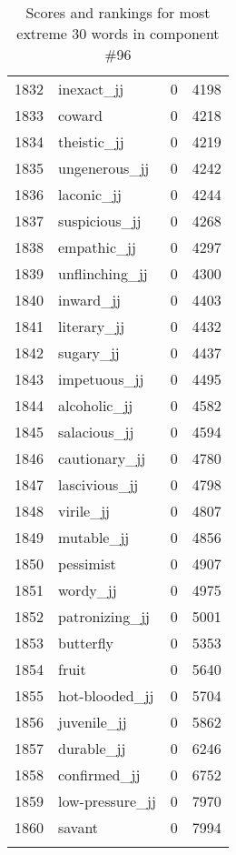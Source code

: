 \begin{longtable}[!htbp]{| rlr@{.}l |}
    1832 & inexact\_jj & 0 & 4198 \\
    1833 & coward & 0 & 4218 \\
    1834 & theistic\_jj & 0 & 4219 \\
    1835 & ungenerous\_jj & 0 & 4242 \\
    1836 & laconic\_jj & 0 & 4244 \\
    1837 & suspicious\_jj & 0 & 4268 \\
    1838 & empathic\_jj & 0 & 4297 \\
    1839 & unflinching\_jj & 0 & 4300 \\
    1840 & inward\_jj & 0 & 4403 \\
    1841 & literary\_jj & 0 & 4432 \\
    1842 & sugary\_jj & 0 & 4437 \\
    1843 & impetuous\_jj & 0 & 4495 \\
    1844 & alcoholic\_jj & 0 & 4582 \\
    1845 & salacious\_jj & 0 & 4594 \\
    1846 & cautionary\_jj & 0 & 4780 \\
    1847 & lascivious\_jj & 0 & 4798 \\
    1848 & virile\_jj & 0 & 4807 \\
    1849 & mutable\_jj & 0 & 4856 \\
    1850 & pessimist & 0 & 4907 \\
    1851 & wordy\_jj & 0 & 4975 \\
    1852 & patronizing\_jj & 0 & 5001 \\
    1853 & butterfly & 0 & 5353 \\
    1854 & fruit & 0 & 5640 \\
    1855 & hot-blooded\_jj & 0 & 5704 \\
    1856 & juvenile\_jj & 0 & 5862 \\
    1857 & durable\_jj & 0 & 6246 \\
    1858 & confirmed\_jj & 0 & 6752 \\
    1859 & low-pressure\_jj & 0 & 7970 \\
    1860 & savant & 0 & 7994 \\
    \hline
    \caption{Scores and rankings for most extreme 30 words in component \#96} \\
\end{longtable}
